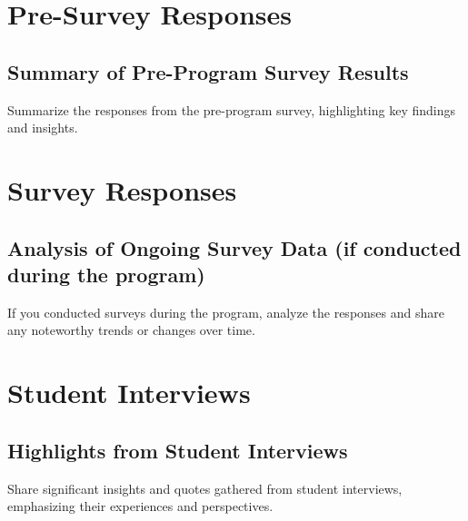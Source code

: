 \documentclass[
]{article}
\begin{document}
\hypertarget{section}{%
\subsection{}\label{section}}

\hypertarget{pre-survey-responses}{%
\section{Pre-Survey Responses}\label{pre-survey-responses}}

\hypertarget{summary-of-pre-program-survey-results}{%
\subsection{Summary of Pre-Program Survey
Results}\label{summary-of-pre-program-survey-results}}

Summarize the responses from the pre-program survey, highlighting key
findings and insights.

\hypertarget{survey-responses}{%
\section{Survey Responses}\label{survey-responses}}

\hypertarget{analysis-of-ongoing-survey-data-if-conducted-during-the-program}{%
\subsection{Analysis of Ongoing Survey Data (if conducted during the
program)}\label{analysis-of-ongoing-survey-data-if-conducted-during-the-program}}

If you conducted surveys during the program, analyze the responses and
share any noteworthy trends or changes over time.

\hypertarget{student-interviews}{%
\section{Student Interviews}\label{student-interviews}}

\hypertarget{highlights-from-student-interviews}{%
\subsection{Highlights from Student
Interviews}\label{highlights-from-student-interviews}}

Share significant insights and quotes gathered from student interviews,
emphasizing their experiences and perspectives.
\end{document}
